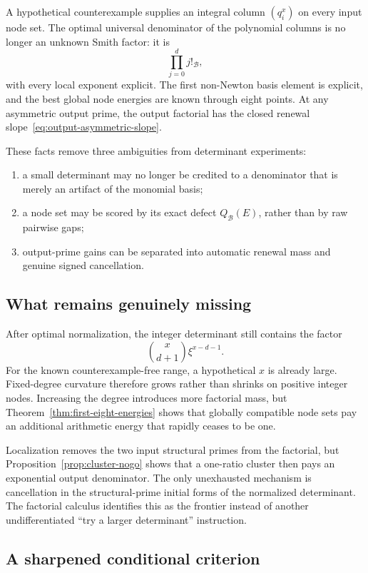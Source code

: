 \documentclass[11pt,oneside]{article}
\theoremstyle{definition}
\theoremstyle{remark}
\newcommand{\B}{\mathcal B}
\begin{document}
A hypothetical counterexample supplies an integral column \((q_i^x)\) on every input node set.
The optimal universal denominator of the polynomial columns is no longer an unknown Smith
factor: it is
\[
 \prod_{j=0}^{d}j!_{\B},
\]
with every local exponent explicit.  The first non-Newton basis element is explicit, and the
best global node energies are known through eight points.  At any asymmetric output prime, the
output factorial has the closed renewal slope~\eqref{eq:output-asymmetric-slope}.

These facts remove three ambiguities from determinant experiments:
\begin{enumerate}
\item a small determinant may no longer be credited to a denominator that is merely an artifact
of the monomial basis;
\item a node set may be scored by its exact defect \(Q_{\B}(E)\), rather than by raw pairwise
gaps;
\item output-prime gains can be separated into automatic renewal mass and genuine signed
cancellation.
\end{enumerate}

\subsection{What remains genuinely missing}

After optimal normalization, the integer determinant still contains the factor
\[
 \binom{x}{d+1}\xi^{x-d-1}.
\]
For the known counterexample-free range, a hypothetical \(x\) is already large.  Fixed-degree
curvature therefore grows rather than shrinks on positive integer nodes.  Increasing the degree
introduces more factorial mass, but Theorem~\ref{thm:first-eight-energies} shows that globally
compatible node sets pay an additional arithmetic energy that rapidly ceases to be one.

Localization removes the two input structural primes from the factorial, but
Proposition~\ref{prop:cluster-nogo} shows that a one-ratio cluster then pays an exponential
output denominator.  The only unexhausted mechanism is cancellation in the structural-prime
initial forms of the normalized determinant.  The factorial calculus identifies this as the
frontier instead of another undifferentiated ``try a larger determinant'' instruction.

\subsection{A sharpened conditional criterion}
\end{document}

